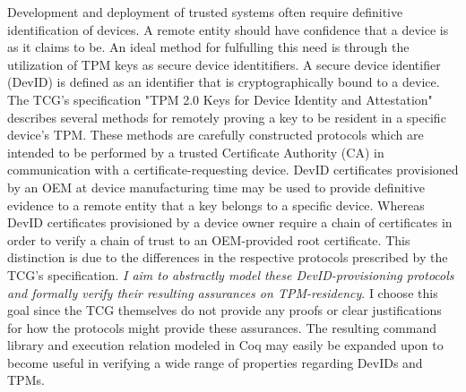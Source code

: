 \begin{abstractlong}


Development and deployment of trusted systems often require definitive identification of devices. A remote entity should have confidence that a device is as it claims to be. An ideal method for fulfulling this need is through the utilization of TPM keys as secure device identitifiers. A secure device identifier (DevID) is defined as an identifier that is cryptographically bound to a device. 
The TCG's specification "TPM 2.0 Keys for Device Identity and Attestation" describes several methods for remotely proving a key to be resident in a specific device's TPM. These methods are carefully constructed protocols which are intended to be performed by a trusted Certificate Authority (CA) in communication with a certificate-requesting device. DevID certificates provisioned by an OEM at device manufacturing time may be used to provide definitive evidence to a remote entity that a key belongs to a specific device. Whereas DevID certificates provisioned by a device owner require a chain of certificates in order to verify a chain of trust to an OEM-provided root certificate. This distinction is due to the differences in the respective protocols prescribed by the TCG's specification. \textit{I aim to abstractly model these DevID-provisioning protocols and formally verify their resulting assurances on TPM-residency}. I choose this goal since the TCG themselves do not provide any proofs or clear justifications for how the protocols might provide these assurances. The resulting command library and execution relation modeled in Coq may easily be expanded upon to become useful in verifying a wide range of properties regarding DevIDs and TPMs.
\end{abstractlong}




\begin{acknowledgementslong}

\end{acknowledgementslong}

